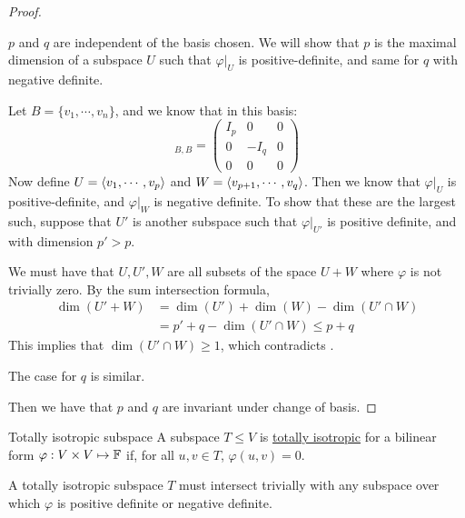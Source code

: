 \documentclass[../Main.tex]{subfiles}
\begin{document}
\begin{proof}
    \begin{subproof}{$p$ and $q$ are independent of the basis chosen.}
        We will show that $p$ is the maximal dimension of a subspace $U$ such that $\varphi |_U$ is positive-definite, and same for $q$ with negative definite.

        Let $B = \{v_1, \cdots, v_n\}$, and we know that in this basis:
        \begin{equation*}
            [\varphi]_{B, B} =
            \begin{pmatrix}
                I_p & 0 & 0 \\
                0 & -I_q & 0 \\
                0 & 0 & 0
            \end{pmatrix}
        \end{equation*}
        Now define $U = \left\langle v_1, \cdots, v_p \right\rangle$ and $W = \left\langle v_{p+1}, \cdots, v_q \right\rangle$. Then we know that $\varphi |_U$ is positive-definite, and $\varphi |_W$ is negative definite. To show that these are the largest such, suppose that $U'$ is another subspace such that $\varphi |_{U'}$ is positive definite, and with dimension $p' > p$.

        We must have that $U, U', W$ are all subsets of the space $U + W$ where $\varphi$ is not trivially zero. By the sum intersection formula,
        \begin{align*}
            \dim(U' + W)&= \dim(U') + \dim(W) - \dim(U' \cap W) \\
            &= p' + q - \dim(U' \cap W) \leq p + q
        \end{align*}
        This implies that $\dim(U' \cap W) \geq 1$, which contradicts .

        The case for $q$ is similar.
    \end{subproof}
    Then we have that $p$ and $q$ are invariant under change of basis.
\end{proof}
\begin{definition}{Totally isotropic subspace}
    A subspace $T \leq V$ is \underline{totally isotropic} for a bilinear form $\varphi : V \times V \mapsto \mathbb{F}$ if, for all $u, v \in T$, $\varphi(u, v) = 0$.
\end{definition}
\begin{remark}
    A totally isotropic subspace $T$ must intersect trivially with any subspace over which $\varphi$ is positive definite or negative definite.
\end{remark}
\end{document}

